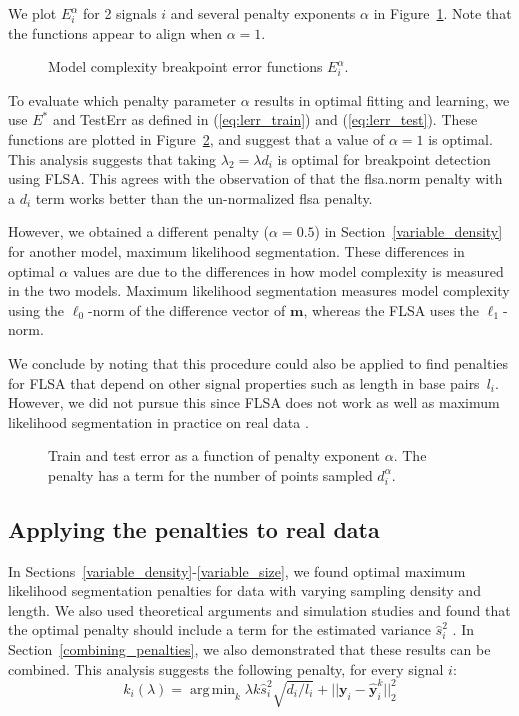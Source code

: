 \documentclass{jsfds} %
\newcommand{\fig}[3][H]{
  \begin{figure}[#1]
    \hskip -1cm
    
    \caption{#3}
    \label{fig:#2}
  \end{figure}
}
\DeclareMathOperator*{\argmin}{arg\,min}
\begin{document}
We plot $E_i^\alpha$ for 2 signals $i$ and several penalty exponents
$\alpha$ in Figure~\ref{fig:variable-density-berr-flsa}. Note that the
functions appear to align when $\alpha=1$.

\fig{variable-density-berr-flsa}{Model complexity breakpoint error
  functions $E_i^\alpha$.}

\newpage

To evaluate which penalty parameter $\alpha$ results in optimal
fitting and learning, we use $E^*$ and TestErr as defined in
(\ref{eq:lerr_train}) and (\ref{eq:lerr_test}). These functions are
plotted in Figure~\ref{fig:variable-density-error-alpha-flsa}, and
suggest that a value of $\alpha=1$ is optimal. This analysis suggests
that taking $\lambda_2=\lambda d_i$ is optimal for breakpoint
detection using FLSA. This agrees with the observation of
\citet{HOCKING-breakpoints} that the flsa.norm penalty with a $d_i$
term works better than the un-normalized flsa penalty.

However, we obtained a different penalty ($\alpha=0.5$) in
Section~\ref{variable_density} for another model, maximum likelihood
segmentation. These differences in optimal $\alpha$ values are due to
the differences in how model complexity is measured in the two
models. Maximum likelihood segmentation measures model complexity
using the $\ell_0$-norm of the difference vector of $\mathbf m$,
whereas the FLSA uses the $\ell_1$-norm.

We conclude by noting that this procedure could also be applied to
find penalties for FLSA that depend on other signal properties such as
length in base pairs~$l_i$. However, we did not pursue this since FLSA
does not work as well as maximum likelihood segmentation in practice
on real data \citep{HOCKING-breakpoints}.

\fig{variable-density-error-alpha-flsa}{Train and test error as a
  function of penalty exponent $\alpha$. The penalty has a term for
  the number of points sampled $d_i^\alpha$.}


\newpage

\subsection{Applying the penalties to real data}

In Sections~\ref{variable_density}-\ref{variable_size}, we found
optimal maximum likelihood segmentation penalties for data with
varying sampling density and length. We also used theoretical
arguments and simulation studies and found that the optimal penalty
should include a term for the estimated variance $\hat s_i^2$
\citep{HOCKING-phd-ch4}. In Section~\ref{combining_penalties}, we also
demonstrated that these results can be combined. This analysis
suggests the following penalty, for every signal $i$:
\begin{equation}
  \label{eq:composite_penalty}
  k_i(\lambda) = 
  \argmin_k
  \lambda k \hat s_i^2 \sqrt{d_i/l_i}  +
  ||\mathbf y_i - \mathbf{\hat y}_i^k||^2_2
\end{equation}
\end{document}
